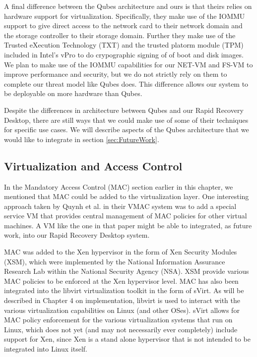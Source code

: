 A final difference between the Qubes architecture and ours is that theirs relies on hardware support for virtualization. Specifically, they make use of the IOMMU support to give direct access to the network card to their network domain and the storage controller to their storage domain. Further they make use of the Trusted eXecution Technology (TXT) and the trusted platorm module (TPM) included in Intel's vPro to do crypographic signing of of boot and disk images. We plan to make use of the IOMMU capabilities for our NET-VM and FS-VM to improve performance and security, but we do not strictly rely on them to complete our threat model like Qubes does. This difference allows our system to be deployable on more hardware than Qubes.

Despite the differences in architecture between Qubes and our Rapid Recovery Desktop, there are still ways that we could make use of some of their techniques for specific use cases. We will describe aspects of the Qubes architecture that we would like to integrate in section \ref{sec:FutureWork}.

\subsection{Virtualization and Access Control}

In the Mandatory Access Control (MAC) section earlier in this chapter, we mentioned that MAC could be added to the virtualization layer. One interesting approach taken by Quynh et al.\cite{Quynh_2006} in their VMAC system was to add a special service VM that provides central management of MAC policies for other virtual machines. A VM like the one in that paper might be able to integrated, as future work, into our Rapid Recovery Desktop system.

MAC was added to the Xen hypervisor in the form of Xen Security Modules (XSM)\cite{xsm_xen_summit_3rd,xsm_xen_summit_4th}, which were implemented by the National Information Assurance Research Lab within the National Security Agency (NSA). XSM provide various MAC policies to be enforced at the Xen hypervisor level. MAC has also been integrated into the libvirt virtualization toolkit\cite{libvirt_website} in the form of sVirt\cite{sVirt_website}. As will be described in Chapter 4 on implementation, libvirt is used to interact with the various virtualization capabilities on Linux (and other OSes).  sVirt allows for MAC policy enforcement for the various virtualization systems that run on Linux, which does not yet (and may not necessarily ever completely) include support for Xen, since Xen is a stand alone hypervisor that is not intended to be integrated into Linux itself.


